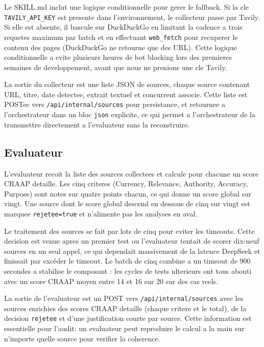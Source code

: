 \documentclass[12pt,a4paper,openany]{report}
\begin{document}
Le SKILL.md inclut une logique conditionnelle pour gerer le fallback. Si la cle \texttt{TAVILY\_API\_KEY} est presente dans l'environnement, le collecteur passe par Tavily. Si elle est absente, il bascule sur DuckDuckGo en limitant la cadence a trois requetes maximum par batch et en effectuant \texttt{web\_fetch} pour recuperer le contenu des pages (DuckDuckGo ne retourne que des URL). Cette logique conditionnelle a evite plusieurs heures de bot blocking lors des premieres semaines de developpement, avant que nous ne prenions une cle Tavily.

La sortie du collecteur est une liste JSON de sources, chaque source contenant URL, titre, date detectee, extrait textuel et concurrent associe. Cette liste est POSTee vers \texttt{/api/internal/sources} pour persistance, et retournee a l'orchestrateur dans un bloc \texttt{json} explicite, ce qui permet a l'orchestrateur de la transmettre directement a l'evaluateur sans la reconstruire.

\subsection{Evaluateur}
\label{sec:skill-evaluateur}

L'evaluateur recoit la liste des sources collectees et calcule pour chacune un score CRAAP detaille. Les cinq criteres (Currency, Relevance, Authority, Accuracy, Purpose) sont notes sur quatre points chacun, ce qui donne un score global sur vingt. Une source dont le score global descend en dessous de cinq sur vingt est marquee \texttt{rejetee=true} et n'alimente pas les analyses en aval.

Le traitement des sources se fait par lots de cinq pour eviter les timeouts. Cette decision est venue apres un premier test ou l'evaluateur tentait de scorer dix-neuf sources en un seul appel, ce qui dependait massivement de la latence DeepSeek et finissait par excéder le timeout. Le batch de cinq combine a un timeout de 900 secondes a stabilise le composant : les cycles de tests ulterieurs ont tous abouti avec un score CRAAP moyen entre 14 et 16 sur 20 sur des cas reels.

La sortie de l'evaluateur est un POST vers \texttt{/api/internal/sources} avec les sources enrichies des scores CRAAP detaille (chaque critere et le total), de la decision \texttt{rejetee} et d'une justification courte par source. Cette information est essentielle pour l'audit: un evaluateur peut reproduire le calcul a la main sur n'importe quelle source pour verifier la coherence.
\end{document}
